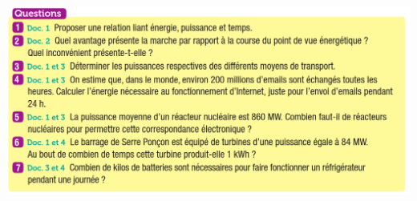 \documentclass[10pt]{article}
\begin{document}
\begin{center}
	\includegraphics[scale=0.3]{assets/q.png}
\end{center}
\end{document}
